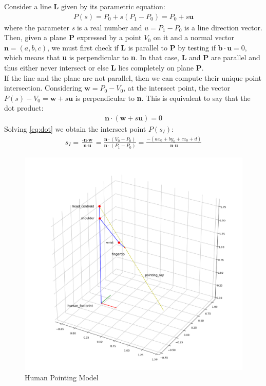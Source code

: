 Consider a line \textbf{L} given by its parametric equation:
\begin{align}
	P(s)= P_0 +s(P_1-P_0)= P_0+s\textbf{u}
\end{align}
where the parameter \emph{s} is a real number and $u=P_1-P_0$ is a line direction vector. Then, given a plane \textbf{P} expressed by a point $V_0$ on it and a normal vector $\textbf{n}=(a,b,c)$, we must first check if \textbf{L} is parallel to \textbf{P} by testing if $\textbf{b}\cdot\textbf{u}=0$, which means that \textbf{u} is perpendicular to \textbf{n}. In that case, \textbf{L} and \textbf{P} are parallel and thus either never intersect or else \textbf{L} lies completely on plane \textbf{P}.\\
If the line and the plane are not parallel, then we can compute their unique point intersection. Considering $\textbf{w} = P_0-V_0$, at the intersect point, the vector $P(s)-V_0=\textbf{w}+s\textbf{u}$ is perpendicular to \textbf{n}. This is equivalent to say that the dot product:
\begin{align}
	\textbf{n}\cdot(\textbf{w}+s\textbf{u})=0 \label{eq:dot}
\end{align}
Solving \ref{eq:dot} we obtain the intersect point $P(s_I)$:
\begin{align}\label{eq:intersection}
	s_I = \frac{\textbf{-n}\cdot\textbf{w}}{\textbf{n}\cdot\textbf{u}}=\frac{\textbf{n}\cdot(V_0-P_0)}{\textbf{n}\cdot(P_1-P_0)}=\frac{-(ax_0+by_0+cz_0+d)}{\textbf{n}\cdot\textbf{u}}
\end{align}
\begin{figure}
	\centering
	\includegraphics[width=\textwidth]{img/pointingModel.png}%
	\caption{Human Pointing Model}
	\label{fig:pointingModel}
\end{figure}
